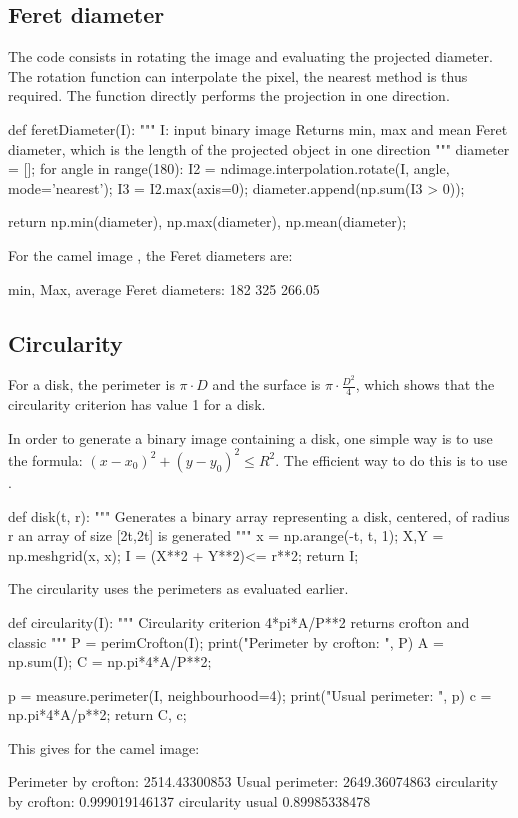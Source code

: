 \subsection{Feret diameter}
The code consists in rotating the image and evaluating the projected diameter. The rotation function can interpolate the pixel, the nearest method is thus required. The function  directly performs the projection in one direction.
\begin{python}
def feretDiameter(I):
    """
    I: input binary image
    Returns min, max and mean Feret diameter, which is the length of the 
    projected object in one direction
    """
    diameter = [];
    for angle in range(180):
        I2 = ndimage.interpolation.rotate(I, angle, mode='nearest');
        I3 = I2.max(axis=0);
        diameter.append(np.sum(I3 > 0));
    
    return np.min(diameter), np.max(diameter), np.mean(diameter);
\end{python}

For the camel image \cite{KimiaDB}, the Feret diameters are:
\begin{sh}
min, Max, average Feret diameters:  182 325 266.05
\end{sh}

\subsection{Circularity}
For a disk, the perimeter is $\pi\cdot D$ and the surface is $\pi\cdot\frac{D^2}{4}$, which shows that the circularity criterion has value 1 for a disk.

In order to generate a binary image containing a disk, one simple way is to use the formula:
$(x-x_0)^2+(y-y_0)^2\leq R^2$. The efficient way to do this is to use .

\begin{python}
def disk(t, r):
    """
    Generates a binary array representing a disk, centered, of radius r
    an array of size [2t,2t] is generated
    """
    x = np.arange(-t, t, 1);
    X,Y = np.meshgrid(x, x);
    I = (X**2 + Y**2)<= r**2;
    return I;
\end{python}

The circularity uses the perimeters as evaluated earlier.
\begin{python}
def circularity(I):
    """
    Circularity criterion
    4*pi*A/P**2
    returns crofton and classic
    """
    P = perimCrofton(I);
    print("Perimeter by crofton: ", P)
    A = np.sum(I);
    C = np.pi*4*A/P**2;
    
    p = measure.perimeter(I, neighbourhood=4);
    print("Usual perimeter: ", p)
    c = np.pi*4*A/p**2;
    return C, c;
\end{python}
This gives for the camel image:
\begin{sh}
Perimeter by crofton:  2514.43300853
Usual perimeter:  2649.36074863
circularity by crofton:  0.999019146137
circularity usual  0.89985338478
\end{sh}

